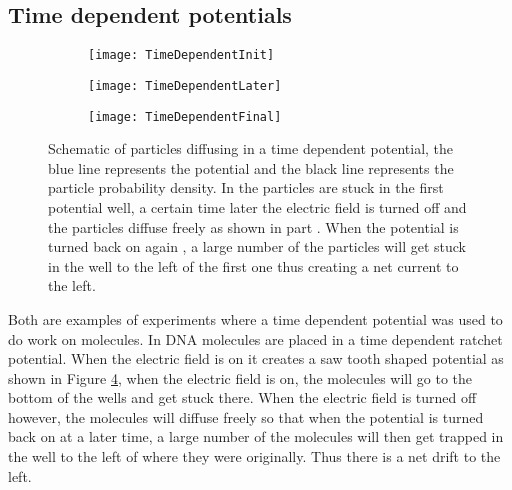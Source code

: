 %
\subsection{Time dependent potentials}

\begin{figure}[tb]
\begin{subfigure}{0.49\textwidth}
		\texttt{[image: TimeDependentInit]}
		\caption{\label{fig:Init}}
\end{subfigure}
\begin{subfigure}{0.49\textwidth}
		\texttt{[image: TimeDependentLater]}
		\caption{\label{fig:NoPot}}
\end{subfigure}
\begin{subfigure}{0.49\textwidth}
		\texttt{[image: TimeDependentFinal]}
             \caption{\label{fig:Final}}
\end{subfigure}
\caption{Schematic of particles diffusing in a time dependent potential, the blue line represents the potential and the black line represents the particle probability density. In  the particles are stuck in the first potential well, a certain time later the electric field is turned off and the particles diffuse freely as shown in part . When the potential is turned back on again , a large number of the particles will get stuck in the well to the left of the first one thus creating a net current to the left.}
\label{fig:TimeDependent}
\end{figure}

Both \cite{BlickleBechinger2011} \cite{JoelBader1999} are examples of experiments where a time dependent potential was used to do work on molecules. In \cite{JoelBader1999} DNA molecules are placed in a time dependent ratchet potential. When the electric field is on it creates a saw tooth shaped potential as shown in Figure \ref{fig:TimeDependent}, when the electric field is on, the molecules will go to the bottom of the wells and get stuck there. When the electric field is turned off however, the molecules will diffuse freely so that when the potential is turned back on at a later time, a large number of the molecules will then get trapped in the well to the left of where they were originally. Thus there is a net drift to the left.

